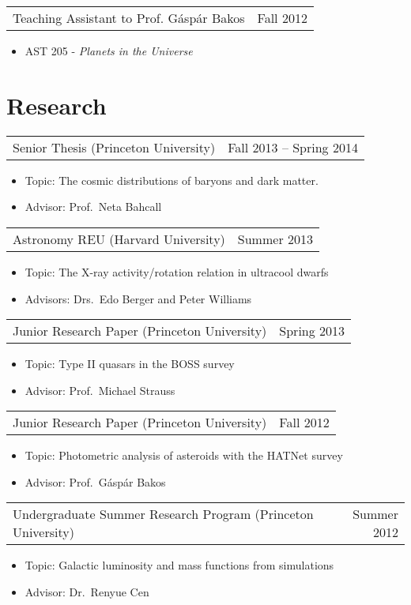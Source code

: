 \documentclass[margin]{res}
\begin{document}
\begin{resume}
\begin{tabular}{@{}p{4in} r}
  Teaching Assistant to Prof. G\'asp\'ar Bakos & Fall 2012
\end{tabular}
\begin{itemize}
\item[] AST 205 - \textit{Planets in the Universe}
\end{itemize}

\normalsize{\section{Research}}
\begin{tabular}{@{}p{4in} r}
  Senior Thesis (Princeton University) & Fall 2013 -- Spring 2014
\end{tabular}
\begin{itemize} \itemsep -2pt
\item[] Topic: The cosmic distributions of baryons and dark matter.
\item[] Advisor: Prof.~Neta Bahcall
\end{itemize}
\begin{tabular}{@{}p{4in} r}
  Astronomy REU (Harvard University) & Summer 2013
\end{tabular}
\begin{itemize} \itemsep -2pt
\item[] Topic: The X-ray activity/rotation relation in ultracool
  dwarfs
\item[] Advisors: Drs.~Edo Berger and Peter Williams
\end{itemize}
\begin{tabular}{@{}p{4in} r}
  Junior Research Paper (Princeton University) & Spring 2013
\end{tabular}
\begin{itemize} \itemsep -2pt
\item[] Topic: Type II quasars in the BOSS survey
\item[] Advisor: Prof.~Michael Strauss
\end{itemize}
\begin{tabular}{@{}p{4in} r}
  Junior Research Paper (Princeton University) & Fall 2012
\end{tabular}
\begin{itemize} \itemsep -2pt
\item[] Topic: Photometric analysis of asteroids with the HATNet
  survey
\item[] Advisor: Prof.~G\'asp\'ar Bakos
\end{itemize}
\begin{tabular}{@{}p{4in} r}
  Undergraduate Summer Research Program (Princeton University) &
  Summer 2012
\end{tabular}
\begin{itemize} \itemsep -2pt
\item[] Topic: Galactic luminosity and mass functions from simulations
\item[] Advisor: Dr.~Renyue Cen
\end{itemize}


\end{resume}
\end{document}
